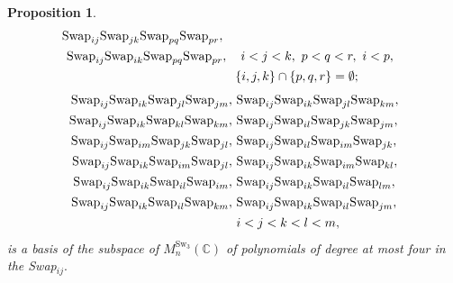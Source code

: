 \documentclass[12pt,dvipsnames,accepted=2016-08-18,a4paper,onecolumn]{quantumarticle}
\numberwithin{equation}{section}
\newtheorem{proposition}[theorem]{Proposition}
\theoremstyle{definition}
\begin{document}
\begin{proposition}
\begin{equation}
\begin{split}
			\textnormal{Swap}_{ij} \textnormal{Swap}_{jk} \textnormal{Swap}_{pq} \textnormal{Swap}_{pr},\\
			\textnormal{Swap}_{ij} \textnormal{Swap}_{ik} \textnormal{Swap}_{pq} \textnormal{Swap}_{pr}&,
			\quad i < j < k, \ p<q<r, \ i<p,\\	
			 &\quad\{i,j,k\} \cap \{p,q,r\} = \emptyset;
            \end{split}
        \end{equation}
         \vspace{2mm}
\begin{equation}\label{3:5}
    \begin{split}
     \textnormal{Swap}_{ij} \textnormal{Swap}_{ik} \textnormal{Swap}_{jl} \textnormal{Swap}_{jm},\ 
       &\textnormal{Swap}_{ij} \textnormal{Swap}_{ik} \textnormal{Swap}_{jl} \textnormal{Swap}_{km},\\
       \textnormal{Swap}_{ij} \textnormal{Swap}_{ik} \textnormal{Swap}_{kl} \textnormal{Swap}_{km},\ 
    &\textnormal{Swap}_{ij} \textnormal{Swap}_{il} \textnormal{Swap}_{jk} \textnormal{Swap}_{jm},\\ 
 \textnormal{Swap}_{ij} \textnormal{Swap}_{im} \textnormal{Swap}_{jk} \textnormal{Swap}_{jl},\
  &\textnormal{Swap}_{ij} \textnormal{Swap}_{il} \textnormal{Swap}_{im} \textnormal{Swap}_{jk},\\
 \textnormal{Swap}_{ij} \textnormal{Swap}_{ik} \textnormal{Swap}_{im} \textnormal{Swap}_{jl},\
        &\textnormal{Swap}_{ij} \textnormal{Swap}_{ik} \textnormal{Swap}_{im} \textnormal{Swap}_{kl},\\
       \textnormal{Swap}_{ij} \textnormal{Swap}_{ik} \textnormal{Swap}_{il} \textnormal{Swap}_{im}, \ 
          &\textnormal{Swap}_{ij} \textnormal{Swap}_{ik} \textnormal{Swap}_{il} \textnormal{Swap}_{lm}, \\
          \textnormal{Swap}_{ij} \textnormal{Swap}_{ik} \textnormal{Swap}_{il} \textnormal{Swap}_{km},\
          &\textnormal{Swap}_{ij} \textnormal{Swap}_{ik} \textnormal{Swap}_{il} \textnormal{Swap}_{jm},\\
             &i<j<k<l<m,
    \end{split}
\end{equation}
 is a basis of the subspace of $M^{\text{Sw}_3}_n(\mathbb{C})$ of polynomials  of degree at most four in the Swap$_{ij}.$
\end{proposition}
\end{document}
